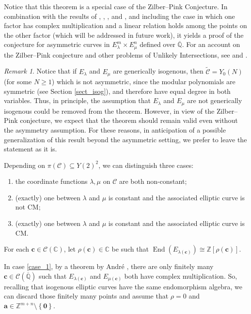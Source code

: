 \documentclass[11pt,a4paper,reqno]{amsart}
\numberwithin{equation}{section}
\newcommand{\Z}{\mathbb{Z}}
\newcommand{\Q}{\mathbb{Q}}
\newcommand{\C}{\mathbb{C}}
\newcommand{\Qal}{\overline{\mathbb{Q}}}
\renewcommand{\c}{\mathcal{C}}
\newcommand{\cc}{\mathbf{c}}
\renewcommand{\l}{\lambda}
\newcommand{\m}{\mu}
\renewcommand{\r}{\rho}
\newcommand{\pq}[1]{\left[ #1 \right]}
\newcommand{\pg}[1]{\left\lbrace #1 \right\rbrace}
\DeclareMathOperator{\en}{End}
\theoremstyle{remark}
\newtheorem{remark}[theorem]{Remark}
\theoremstyle{definition}
\theoremstyle{definition}
\begin{document}
Notice that this theorem is a special case of the Zilber--Pink Conjecture. 
In combination with the results of \cite{BC16}, \cite{BC17}, \cite{Bar19}, and \cite{HP16}, and including the case in which one factor has complex multiplication and a linear relation holds among the points on the other factor (which will be addressed in future work), it yields a proof of the conjecture for asymmetric curves in $E_{\l}^m \times E_{\m}^n$ defined over $\Qal$.
For an account on the Zilber--Pink conjecture and other problems of Unlikely Intersections, see \cite{Zan12} and \cite{Pil22}.
\begin{remark}
Notice that if $E_{\l}$ and $E_{\m}$ are generically isogenous, then $\widetilde{\c}=Y_0(N)$ (for some $N\geq 1$) which is not asymmetric, since the modular polynomials are symmetric (see Section \ref{sect_isog}), and therefore have equal degree in both variables. Thus, in principle, the assumption that $E_{\l}$ and $E_{\m}$ are not generically isogenous could be removed from the theorem. 
However, in view of the Zilber–Pink conjecture, we expect that the theorem should remain valid even without the asymmetry assumption. For these reasons, in anticipation of a possible generalization of this result beyond the asymmetric setting, we prefer to leave the statement as it is.
\end{remark}

Depending on $\pi(\c) \subseteq Y(2)^2$, we can distinguish three cases: 
\begin{enumerate}[label=(\roman*)]
\item\label{case_1} the coordinate functions $\l, \m$ on $\c$ are both non-constant;
\item\label{case_2} (exactly) one between $\l$ and $\m$ is constant and the associated elliptic curve is not CM;
\item\label{case_3} (exactly) one between $\l$ and $\m$ is constant and the associated elliptic curve is CM.
\end{enumerate}

For each $\cc \in \c(\C)$, let $\r(\cc) \in \C$ be such that $\en(E_{\l(\cc)})\cong\Z\pq{\r(\cc)}$. 

In case \ref{case_1}, by a theorem by André \cite{And98}, there are only finitely many $\cc \in \c(\overline{\Q})$ such that $E_{\l(\cc)}$ and $E_{\m(\cc)}$ both have complex multiplication. So, recalling that isogenous elliptic curves have the same endomorphism algebra, we can discard those finitely many points and assume that $\r=0$ and $\mathbf{a} \in \Z^{m+n}\setminus \pg{\mathbf{0}}$.
\end{document}
